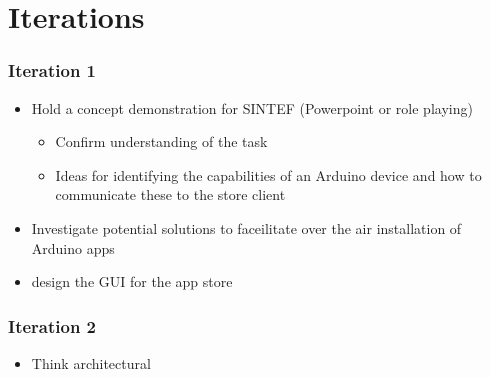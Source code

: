 \chapter{Iterations}
\subsection{Iteration 1}
\begin{itemize}
	\item{Hold a concept demonstration for SINTEF (Powerpoint or role playing)}
	\begin{itemize}
		\item{Confirm understanding of the task}
		\item{Ideas for identifying the capabilities of an Arduino device and how to communicate these to the store client}
	\end{itemize}
	\item{Investigate potential solutions to faceilitate over the air installation of Arduino apps}
	\item{design the GUI for the app store}
\end{itemize}

\subsection{Iteration 2}
\begin{itemize}
	\item{Think architectural}
\end{itemize}